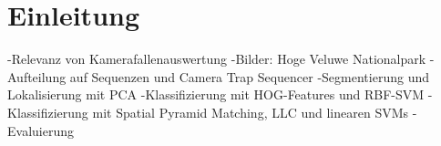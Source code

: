 \newpage
\section{Einleitung}

-Relevanz von Kamerafallenauswertung
-Bilder: Hoge Veluwe Nationalpark
-Aufteilung auf Sequenzen und Camera Trap Sequencer
-Segmentierung und Lokalisierung mit PCA
-Klassifizierung mit HOG-Features und RBF-SVM
-Klassifizierung mit Spatial Pyramid Matching, LLC und linearen SVMs
-Evaluierung